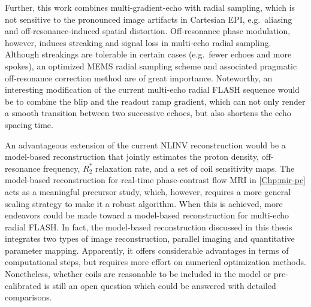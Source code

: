 Further, this work combines multi-gradient-echo with radial sampling, which is not sensitive to the pronounced image artifacts in Cartesian EPI, e.g.~aliasing and off-resonance-induced spatial distortion. Off-resonance phase modulation, however, induces streaking and signal loss in multi-echo radial sampling. Although streakings are tolerable in certain cases (e.g.~fewer echoes and more spokes), an optimized MEMS radial sampling scheme and associated pragmatic off-resonance correction method are of great importance. Noteworthy, an interesting modification of the current multi-echo radial FLASH sequence would be to combine the blip and the readout ramp gradient, which can not only render a smooth transition between two successive echoes, but also shortens the echo spacing time.

An advantageous extension of the current NLINV reconstruction would be a model-based reconstruction that jointly estimates the proton density, off-resonance frequency, $R_2^*$ relaxation rate, and a set of coil sensitivity maps. The model-based reconstruction for real-time phase-contrast flow MRI in \cref{Chp:mir-pc} acts as a meaningful precursor study, which, however, requires a more general scaling strategy to make it a robust algorithm. When this is achieved, more endeavors could be made toward a model-based reconstruction for multi-echo radial FLASH. In fact, the model-based reconstruction discussed in this thesis integrates two types of image reconstruction, parallel imaging and quantitative parameter mapping. Apparently, it offers considerable advantages in terms of computational steps, but requires more effort on numerical optimization methods. Nonetheless, whether coils are reasonable to be included in the model or pre-calibrated is still an open question which could be answered with detailed comparisons.
